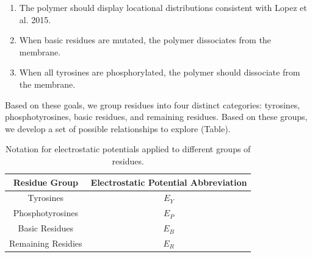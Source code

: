 \documentclass[../../AdvancementSummary.tex]{subfiles}
\begin{document}
{\begin{enumerate}
	\item The polymer should display locational distributions consistent with Lopez et al. 2015. \cite{Lopez2015}
	\item When basic residues are mutated, the polymer dissociates from the membrane. \cite{Zhang2011}
	\item When all tyrosines are phosphorylated, the polymer should dissociate from the membrane. 
\end{enumerate}

Based on these goals, we group residues into four distinct categories: tyrosines, phosphotyrosines, basic residues, and remaining residues. Based on these groups, we develop a set of possible relationships to explore (Table).  

\begin{table}[H]
\caption{Notation for electrostatic potentials applied to different groups of residues. \label{table: ElecPotentialNotation}}
\begin{center}
\begin{tabular}{ c | c}
\hline
Residue Group & Electrostatic Potential Abbreviation \\
\hline
Tyrosines & $E_Y$ \\
Phosphotyrosines & $E_P$ \\
Basic Residues & $E_B$ \\
Remaining Residies & $E_R$ \\
\hline
\end{tabular}
\end{center}
\end{table}

}
\end{document}
